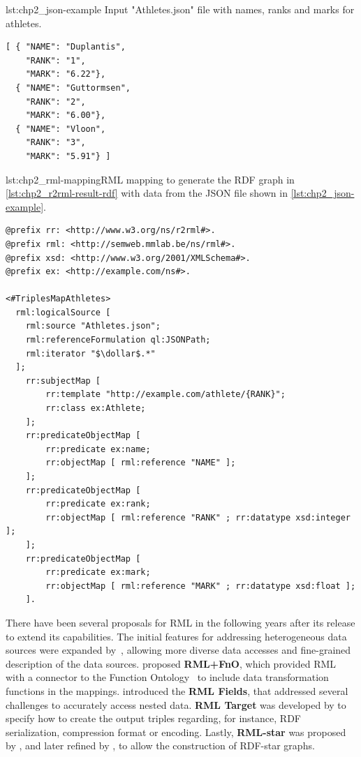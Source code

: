 \begin{minipage}{\textwidth}
\begin{captionedlisting}{lst:chp2_json-example}
{Input "Athletes.json" file with names, ranks and marks for athletes.}
\centering
\begin{multicols}{2}
{\begin{lstlisting}[]
[ { "NAME": "Duplantis",
    "RANK": "1",
    "MARK": "6.22"},
  { "NAME": "Guttormsen",
    "RANK": "2",  
    "MARK": "6.00"},
  { "NAME": "Vloon",
    "RANK": "3",
    "MARK": "5.91"} ]
\end{lstlisting}}
\end{multicols}
\end{captionedlisting}
\end{minipage}


\begin{captionedlisting}{lst:chp2_rml-mapping}{RML mapping to generate the RDF graph in \cref{lst:chp2_r2rml-result-rdf} with data from the JSON file shown in \cref{lst:chp2_json-example}.}
\centering
{\begin{lstlisting}[language=r2rml]
@prefix rr: <http://www.w3.org/ns/r2rml#>.
@prefix rml: <http://semweb.mmlab.be/ns/rml#>.
@prefix xsd: <http://www.w3.org/2001/XMLSchema#>.
@prefix ex: <http://example.com/ns#>.

<#TriplesMapAthletes>
  rml:logicalSource [
    rml:source "Athletes.json";
    rml:referenceFormulation ql:JSONPath;
    rml:iterator "$\dollar$.*"
  ];
    rr:subjectMap [
        rr:template "http://example.com/athlete/{RANK}";
        rr:class ex:Athlete;
    ];
    rr:predicateObjectMap [
        rr:predicate ex:name;
        rr:objectMap [ rml:reference "NAME" ];
    ];
    rr:predicateObjectMap [
        rr:predicate ex:rank;
        rr:objectMap [ rml:reference "RANK" ; rr:datatype xsd:integer ];
    ];
    rr:predicateObjectMap [
        rr:predicate ex:mark;
        rr:objectMap [ rml:reference "MARK" ; rr:datatype xsd:float ];
    ].
\end{lstlisting}}
\end{captionedlisting}

There have been several proposals for RML in the following years after its release to extend its capabilities. The initial features for addressing heterogeneous data sources were expanded by~\cite{Dimou2015Machine}, allowing more diverse data accesses and fine-grained description of the data sources. \cite{DeMeester2017fno_dbpedia} proposed \textbf{RML+FnO}, which provided RML with a connector to the Function Ontology~\parencite{demeester2016fno} to include data transformation functions in the mappings. \cite{delva2021rml-fields} introduced the \textbf{RML Fields}, that addressed several challenges to accurately access nested data. \textbf{RML Target} was developed by \cite{VanAssche2021LeveragingWebThings} to specify how to create the output triples regarding, for instance, RDF serialization, compression format or encoding. Lastly, \textbf{RML-star} was proposed by \cite{delva2021rml-star}, and later refined by \cite{arenas2023morphstar}, to allow the construction of RDF-star graphs. 

